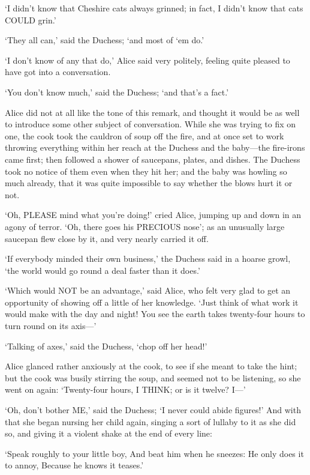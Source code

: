 \documentclass[12pt]{article}
\begin{document}
\begin{Parallel}[p]{}{}
{‘I didn’t know that Cheshire cats always grinned; in fact, I didn’t know that cats COULD grin.’

‘They all can,’ said the Duchess; ‘and most of ‘em do.’

‘I don’t know of any that do,’ Alice said very politely, feeling quite pleased to have got into a conversation.

‘You don’t know much,’ said the Duchess; ‘and that’s a fact.’

Alice did not at all like the tone of this remark, and thought it would be as well to introduce some other subject of conversation. While she was trying to fix on one, the cook took the cauldron of soup off the fire, and at once set to work throwing everything within her reach at the Duchess and the baby—the fire-irons came first; then followed a shower of saucepans, plates, and dishes. The Duchess took no notice of them even when they hit her; and the baby was howling so much already, that it was quite impossible to say whether the blows hurt it or not.

‘Oh, PLEASE mind what you’re doing!’ cried Alice, jumping up and down in an agony of terror. ‘Oh, there goes his PRECIOUS nose’; as an unusually large saucepan flew close by it, and very nearly carried it off.

‘If everybody minded their own business,’ the Duchess said in a hoarse growl, ‘the world would go round a deal faster than it does.’

‘Which would NOT be an advantage,’ said Alice, who felt very glad to get an opportunity of showing off a little of her knowledge. ‘Just think of what work it would make with the day and night! You see the earth takes twenty-four hours to turn round on its axis—’

‘Talking of axes,’ said the Duchess, ‘chop off her head!’

Alice glanced rather anxiously at the cook, to see if she meant to take the hint; but the cook was busily stirring the soup, and seemed not to be listening, so she went on again: ‘Twenty-four hours, I THINK; or is it twelve? I—’

‘Oh, don’t bother ME,’ said the Duchess; ‘I never could abide figures!’ And with that she began nursing her child again, singing a sort of lullaby to it as she did so, and giving it a violent shake at the end of every line:

   ‘Speak roughly to your little boy,
    And beat him when he sneezes:
   He only does it to annoy,
    Because he knows it teases.’

}
\end{Parallel}
\end{document}
